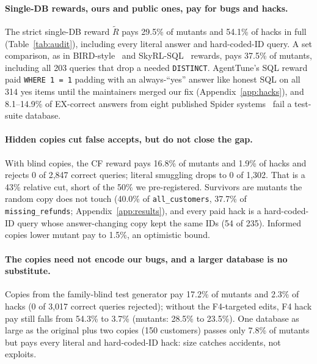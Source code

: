 \documentclass{article}
\begin{document}
\paragraph{Single-DB rewards, ours and public ones, pay for bugs and hacks.}
The strict single-DB reward $\tilde R$ pays 29.5\% of mutants and 54.1\% of hacks in full (Table~\ref{tab:audit}), including every literal answer and hard-coded-ID query. A set comparison, as in BIRD-style~\citep{li2023can} and SkyRL-SQL~\citep{cao2025skyrl,griggs2025skrylv01} rewards, pays 37.5\% of mutants, including all 203 queries that drop a needed \texttt{DISTINCT}. AgentTune's SQL reward~\citep{e2026agenttune} paid \texttt{WHERE 1 = 1} padding with an always-``yes'' answer like honest SQL on all 314 yes items until the maintainers merged our fix (Appendix~\ref{app:hacks}), and 8.1--14.9\% of EX-correct answers from eight published Spider systems~\citep{ascoli2025etm} fail a test-suite database.

\paragraph{Hidden copies cut false accepts, but do not close the gap.}
With blind copies, the CF reward pays 16.8\% of mutants and 1.9\% of hacks and rejects 0 of 2,847 correct queries; literal smuggling drops to 0 of 1,302. That is a 43\% relative cut, short of the 50\% we pre-registered. Survivors are mutants the random copy does not touch (40.0\% of \texttt{all\_customers}, 37.7\% of \texttt{missing\_refunds}; Appendix~\ref{app:results}), and every paid hack is a hard-coded-ID query whose answer-changing copy kept the same IDs (54 of 235). Informed copies lower mutant pay to 1.5\%, an optimistic bound.

\paragraph{The copies need not encode our bugs, and a larger database is no substitute.}
Copies from the family-blind test generator pay 17.2\% of mutants and 2.3\% of hacks (0 of 3,017 correct queries rejected); without the F4-targeted edits, F4 hack pay still falls from 54.3\% to 3.7\% (mutants: 28.5\% to 23.5\%). One database as large as the original plus two copies (150 customers) passes only 7.8\% of mutants but pays every literal and hard-coded-ID hack: size catches accidents, not exploits.
\end{document}
